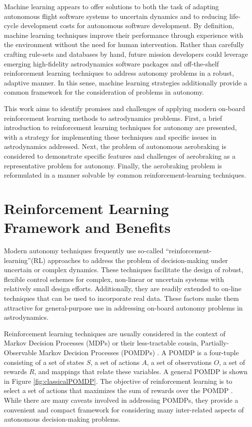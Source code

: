 \documentclass[paper,11pt]{AAS}		%
\begin{document}
Machine learning appears to offer solutions to both the task of adapting autonomous flight software systems to uncertain dynamics and to reducing life-cycle development costs for autonomous software development. By definition, machine learning techniques improve their performance through experience with the environment without the need for human intervention. Rather than carefully crafting rule-sets and databases by hand, future mission developers could leverage emerging high-fidelity astrodynamics software packages and off-the-shelf reinforcement learning techniques to address autonomy problems in a robust, adaptive manner. In this sense, machine learning strategies additionally provide a common framework for the consideration of problems in autonomy.

This work aims to identify promises and challenges of applying modern on-board reinforcement learning methods to astrodynamics problems. First, a brief introduction to reinforcement learning techniques for autonomy are presented, with a strategy for implementing these techniques and specific issues in astrodynamics addressed. Next, the problem of autonomous aerobraking is considered to demonstrate specific features and challenges of aerobraking as a representative problem for autonomy. Finally, the aerobraking problem is reformulated in a manner solvable by common reinforcement-learning techniques. 


\section{Reinforcement Learning Framework and Benefits}

Modern autonomy techniques frequently use so-called ``reinforcement-learning''(RL) approaches to address the problem of decision-making under uncertain or complex dynamics. These techniques facilitate the design of robust, flexible control schemes for  complex, non-linear or uncertain systems with relatively small design efforts. Additionally, they are readily extended to on-line techniques that can be used to 
incorporate real data. These factors make them attractive for general-purpose use in addressing on-board autonomy problems in astrodynamics.

Reinforcement learning techniques are usually considered in the context of Markov Decision Processes  (MDPs) or their less-tractable cousin, Partially-Observable Markov Decision Processes (POMDPs) \cite{Cassandra1997}. A POMDP is a four-tuple consisting of a set of states $S$, a set of actions $A$, a set of observations $O$, a set of rewards $R$, and mappings that relate these variables. A general POMDP is shown in Figure \ref{fig:classicalPOMDP}. The objective of reinforcement learning is to select a set of actions that maximizes the sum of rewards over the POMDP \cite{Sutton2012}. While there are many caveats involved in addressing POMDPs, they provide a convenient and compact framework for considering many inter-related aspects of autonomous decision-making problems.
\end{document}
